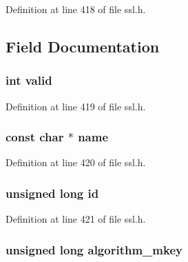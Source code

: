 Definition at line 418 of file ssl.\+h.



\subsection{Field Documentation}
\subsubsection[{\texorpdfstring{valid}{valid}}]{\setlength{\rightskip}{0pt plus 5cm}int valid}\hypertarget{structssl__cipher__st_ac63b1f168765a53e565a8ba27f5469d1}{}\label{structssl__cipher__st_ac63b1f168765a53e565a8ba27f5469d1}


Definition at line 419 of file ssl.\+h.

\subsubsection[{\texorpdfstring{name}{name}}]{\setlength{\rightskip}{0pt plus 5cm}const char $\ast$ name}\hypertarget{structssl__cipher__st_afcd1706c9144e6d6eee6127661ae3be2}{}\label{structssl__cipher__st_afcd1706c9144e6d6eee6127661ae3be2}


Definition at line 420 of file ssl.\+h.

\subsubsection[{\texorpdfstring{id}{id}}]{\setlength{\rightskip}{0pt plus 5cm}unsigned long id}\hypertarget{structssl__cipher__st_af17b8bd946e0f93c6550050f9e8aa349}{}\label{structssl__cipher__st_af17b8bd946e0f93c6550050f9e8aa349}


Definition at line 421 of file ssl.\+h.

\subsubsection[{\texorpdfstring{algorithm\+\_\+mkey}{algorithm_mkey}}]{\setlength{\rightskip}{0pt plus 5cm}unsigned long algorithm\+\_\+mkey}\hypertarget{structssl__cipher__st_aab0332f63d2beb9ee30db884c4bb8f16}{}\label{structssl__cipher__st_aab0332f63d2beb9ee30db884c4bb8f16}


